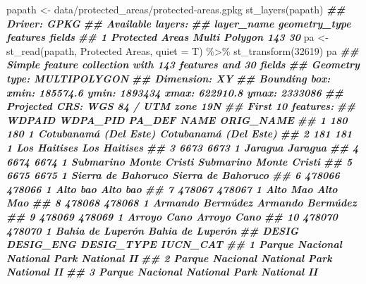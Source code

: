 \documentclass[10pt,landscape,a3paper]{article}
\newenvironment{Shaded}{\begin{snugshade}}{\end{snugshade}}
\newcommand{\AttributeTok}[1]{\textcolor[rgb]{0.77,0.63,0.00}{#1}}
\newcommand{\DecValTok}[1]{\textcolor[rgb]{0.00,0.00,0.81}{#1}}
\newcommand{\DocumentationTok}[1]{\textcolor[rgb]{0.56,0.35,0.01}{\textbf{\textit{#1}}}}
\newcommand{\FunctionTok}[1]{\textcolor[rgb]{0.00,0.00,0.00}{#1}}
\newcommand{\NormalTok}[1]{#1}
\newcommand{\OtherTok}[1]{\textcolor[rgb]{0.56,0.35,0.01}{#1}}
\newcommand{\SpecialCharTok}[1]{\textcolor[rgb]{0.00,0.00,0.00}{#1}}
\newcommand{\StringTok}[1]{\textcolor[rgb]{0.31,0.60,0.02}{#1}}
\begin{document}
\begin{Shaded}
\begin{Highlighting}[]
\NormalTok{papath }\OtherTok{\textless{}{-}} \StringTok{\textquotesingle{}data/protected\_areas/protected{-}areas.gpkg\textquotesingle{}}
\FunctionTok{st\_layers}\NormalTok{(papath)}
\DocumentationTok{\#\# Driver: GPKG }
\DocumentationTok{\#\# Available layers:}
\DocumentationTok{\#\#        layer\_name geometry\_type features fields}
\DocumentationTok{\#\# 1 Protected Areas Multi Polygon      143     30}
\NormalTok{pa }\OtherTok{\textless{}{-}} \FunctionTok{st\_read}\NormalTok{(papath, }\StringTok{\textquotesingle{}Protected Areas\textquotesingle{}}\NormalTok{, }\AttributeTok{quiet =}\NormalTok{ T) }\SpecialCharTok{\%\textgreater{}\%} \FunctionTok{st\_transform}\NormalTok{(}\DecValTok{32619}\NormalTok{)}
\NormalTok{pa}
\DocumentationTok{\#\# Simple feature collection with 143 features and 30 fields}
\DocumentationTok{\#\# Geometry type: MULTIPOLYGON}
\DocumentationTok{\#\# Dimension:     XY}
\DocumentationTok{\#\# Bounding box:  xmin: 185574.6 ymin: 1893434 xmax: 622910.8 ymax: 2333086}
\DocumentationTok{\#\# Projected CRS: WGS 84 / UTM zone 19N}
\DocumentationTok{\#\# First 10 features:}
\DocumentationTok{\#\#    WDPAID WDPA\_PID PA\_DEF                   NAME              ORIG\_NAME}
\DocumentationTok{\#\# 1     180      180      1  Cotubanamá (Del Este)  Cotubanamá (Del Este)}
\DocumentationTok{\#\# 2     181      181      1           Los Haitises           Los Haitises}
\DocumentationTok{\#\# 3    6673     6673      1                Jaragua                Jaragua}
\DocumentationTok{\#\# 4    6674     6674      1 Submarino Monte Cristi Submarino Monte Cristi}
\DocumentationTok{\#\# 5    6675     6675      1     Sierra de Bahoruco     Sierra de Bahoruco}
\DocumentationTok{\#\# 6  478066   478066      1               Alto bao               Alto bao}
\DocumentationTok{\#\# 7  478067   478067      1               Alto Mao               Alto Mao}
\DocumentationTok{\#\# 8  478068   478068      1       Armando Bermúdez       Armando Bermúdez}
\DocumentationTok{\#\# 9  478069   478069      1            Arroyo Cano            Arroyo Cano}
\DocumentationTok{\#\# 10 478070   478070      1       Bahia de Luperón       Bahia de Luperón}
\DocumentationTok{\#\#                        DESIG            DESIG\_ENG DESIG\_TYPE IUCN\_CAT}
\DocumentationTok{\#\# 1            Parque Nacional        National Park   National       II}
\DocumentationTok{\#\# 2            Parque Nacional        National Park   National       II}
\DocumentationTok{\#\# 3            Parque Nacional        National Park   National       II}

\end{Highlighting}
\end{Shaded}
\end{document}
